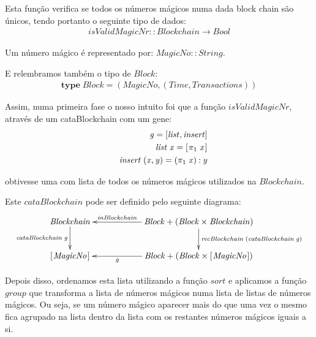 \documentclass[a4paper]{article}
\newcommand{\Conid}[1]{\mathit{#1}}
\newcommand{\Varid}[1]{\mathit{#1}}
\begin{document}
\begin{enumerate}
Esta função verifica se todos os números mágicos numa dada block chain são únicos,
tendo portanto o seguinte tipo de dados:
\begin{eqnarray*}
\ensuremath{\Varid{isValidMagicNr}\mathbin{::}\Conid{Blockchain}\to \Conid{Bool}}
\end{eqnarray*}

Um número mágico é representado por: \ensuremath{\Conid{MagicNo}\mathbin{::}\Conid{String}}.

E relembramos também o tipo de \ensuremath{\Conid{Block}}:
\begin{eqnarray*}
\ensuremath{\mathbf{type}\;\Conid{Block}\mathrel{=}(\Conid{MagicNo},(\Conid{Time},\Conid{Transactions}))}
\end{eqnarray*}


Assim, numa primeira fase o nosso intuito foi que a função \ensuremath{\Varid{isValidMagicNr}},
através de um cataBlockchain com um gene:
\begin{eqnarray*}
\start
\ensuremath{\Varid{g}\mathrel{=}\alt{\Varid{list}}{\Varid{insert}}}
\more
\ensuremath{\Varid{list}\;\Varid{x}\mathrel{=}[\mskip1.5mu \p1\;\Varid{x}\mskip1.5mu]}
\more
\ensuremath{\Varid{insert}\;(\Varid{x},\Varid{y})\mathrel{=}(\p1\;\Varid{x})\mathbin{:}\Varid{y}}
\end{eqnarray*}

obtivesse uma com lista de todos os números mágicos utilizados na \ensuremath{\Conid{Blockchain}}.

Este \ensuremath{\Varid{cataBlockchain}} pode ser definido pelo seguinte diagrama:
\begin{eqnarray*}
\xymatrix@C=2cm{
    \ensuremath{\Conid{Blockchain}}
           \ar[d]_-{\ensuremath{\Varid{cataBlockchain}\;\Varid{g}}}
&
    \ensuremath{\Conid{Block}\mathbin{+}(\Conid{Block}\times\Conid{Blockchain})}
           \ar[d]^{\ensuremath{\Varid{recBlockchain}\;(\Varid{cataBlockchain}\;\Varid{g})}}
           \ar[l]_-{\ensuremath{\Varid{inBlockchain}}}
\\
     \ensuremath{[\mskip1.5mu \Conid{MagicNo}\mskip1.5mu]}
&
     \ensuremath{\Conid{Block}\mathbin{+}(\Conid{Block}\times[\mskip1.5mu \Conid{MagicNo}\mskip1.5mu])}
           \ar[l]^-{\ensuremath{\Varid{g}}}
}
\end{eqnarray*}

Depois disso, ordenamos esta lista utilizando a função \ensuremath{\Varid{sort}}
e aplicamos a função \ensuremath{\Varid{group}} que transforma a lista de números mágicos numa
lista de listas de números mágicos. Ou seja, se um número mágico aparecer mais
do que uma vez o mesmo fica agrupado na lista dentro da lista com os restantes
números mágicos iguais a si.


\end{enumerate}
\end{document}
